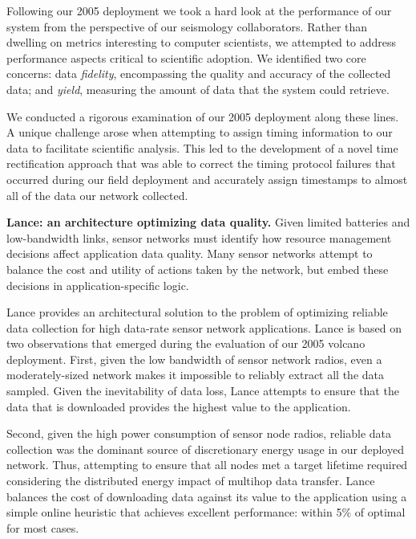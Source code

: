 Following our 2005 deployment we took a hard look at the performance of our
system from the perspective of our seismology collaborators. Rather than
dwelling on metrics interesting to computer scientists, we attempted to
address performance aspects critical to scientific adoption. We identified
two core concerns: data \textit{fidelity}, encompassing the quality and
accuracy of the collected data; and \textit{yield}, measuring the amount of
data that the system could retrieve.

We conducted a rigorous examination of our 2005 deployment along these lines.
A unique challenge arose when attempting to assign timing information to our
data to facilitate scientific analysis. This led to the development of a
novel time rectification approach that was able to correct the timing
protocol failures that occurred during our field deployment and accurately
assign timestamps to almost all of the data our network collected.

\vspace*{0.1in}

\noindent \textbf{Lance: an architecture optimizing data quality.} Given
limited batteries and low-bandwidth links, sensor networks must identify how
resource management decisions affect application data quality. Many sensor
networks attempt to balance the cost and utility of actions taken by the
network, but embed these decisions in application-specific logic.

Lance provides an architectural solution to the problem of optimizing
reliable data collection for high data-rate sensor network applications.
Lance is based on two observations that emerged during the evaluation of our
2005 volcano deployment. First, given the low bandwidth of sensor network
radios, even a moderately-sized network makes it impossible to reliably
extract all the data sampled. Given the inevitability of data loss, Lance
attempts to ensure that the data that is downloaded provides the highest
value to the application.

Second, given the high power consumption of sensor node radios, reliable data
collection was the dominant source of discretionary energy usage in our
deployed network. Thus, attempting to ensure that all nodes met a target
lifetime required considering the distributed energy impact of multihop data
transfer. Lance balances the cost of downloading data against its value to
the application using a simple online heuristic that achieves excellent
performance: within 5\% of optimal for most cases.

